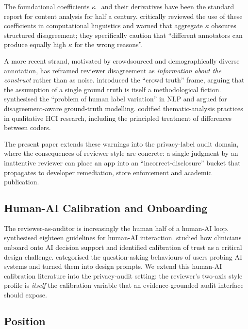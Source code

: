 \documentclass[11pt,a4paper]{article}
\begin{document}
The foundational coefficients
$\kappa$~\citep{cohen1960coefficient,landis1977measurement,
fleiss1971measuring} and their derivatives have been the standard
report for content analysis for half a century. \citet{artstein2008intercoder}
critically reviewed the use of these coefficients in computational
linguistics and warned that aggregate $\kappa$ obscures structured
disagreement; they specifically caution that ``different annotators
can produce equally high $\kappa$ for the wrong reasons''.

A more recent strand, motivated by crowdsourced and demographically
diverse annotation, has reframed reviewer disagreement as
\emph{information about the construct} rather than as noise.
\citet{aroyo2015truth} introduced the ``crowd truth'' frame,
arguing that the assumption of a single ground truth is itself a
methodological fiction. \citet{plank2022problem} synthesised the
``problem of human label variation'' in NLP and argued for
disagreement-aware ground-truth modelling. \citet{braun2006using}
codified thematic-analysis practices in qualitative HCI research,
including the principled treatment of differences between coders.

The present paper extends these warnings into the privacy-label audit
domain, where the consequences of reviewer style are concrete: a
single judgment by an inattentive reviewer can place an app into
an ``incorrect-disclosure'' bucket that propagates to developer
remediation, store enforcement and academic publication.

\subsection{Human-AI Calibration and Onboarding}
\label{sec:rel-hai}

The reviewer-as-auditor is increasingly the human half of a
human-AI loop. \citet{amershi2019guidelines} synthesised eighteen
guidelines for human-AI interaction. \citet{cai2019hello} studied
how clinicians onboard onto AI decision support and identified
calibration of trust as a critical design challenge.
\citet{liao2020questioning} categorised the question-asking
behaviours of users probing AI systems and turned them into design
prompts. We extend this human-AI calibration literature into the
privacy-audit setting: the reviewer's two-axis style profile is
\emph{itself} the calibration variable that an evidence-grounded
audit interface should expose.

\subsection{Position}
\label{sec:rel-position}
\end{document}
